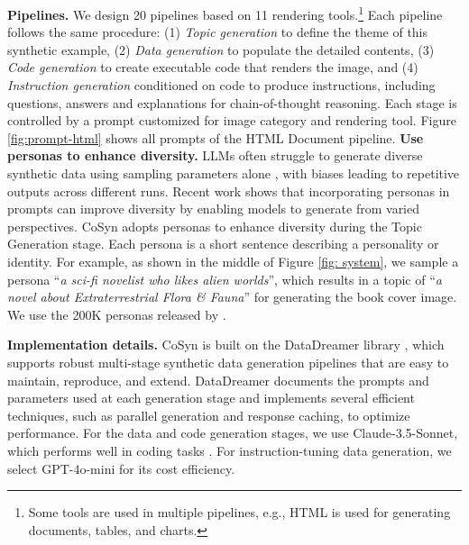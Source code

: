 \smallbreak
\noindent \textbf{Pipelines.} We design 20 pipelines based on 11 rendering tools.\footnote {Some tools are used in multiple pipelines, e.g., HTML is used for generating documents, tables, and charts.} 
Each pipeline follows the same procedure: (1) \textit{Topic generation} to define the theme of this synthetic example, (2) \textit{Data generation} to populate the detailed contents, (3) \textit{Code generation} to create executable code that renders the image, and (4) \textit{Instruction generation} conditioned on code to produce instructions, including questions, answers and explanations for chain-of-thought reasoning.
Each stage is controlled by a prompt customized for image category and rendering tool. Figure \ref{fig:prompt-html} shows all prompts of the HTML Document pipeline.
\smallbreak
\noindent \textbf{Use personas to enhance diversity.} 
LLMs often struggle to generate diverse synthetic data using sampling parameters alone \citep{yu2023large}, with biases leading to repetitive outputs across different runs. 
Recent work \citep{ge2024scalingsyntheticdatacreation} shows that incorporating personas in prompts can improve diversity by enabling models to generate from varied perspectives.
CoSyn adopts personas to enhance diversity during the Topic Generation stage. 
Each persona is a short sentence describing a personality or identity. 
For example, as shown in the middle of Figure \ref{fig: system}, we sample a persona ``\textit{a sci-fi novelist who likes alien worlds}'', which results in a topic of ``\textit{a novel about Extraterrestrial Flora \& Fauna}'' for generating the book cover image. 
We use the 200K personas released by \citet{ge2024scalingsyntheticdatacreation}.

\smallbreak
\noindent \textbf{Implementation details.} 
CoSyn is built on the DataDreamer library \citep{patel-etal-2024-datadreamer}, which supports robust multi-stage synthetic data generation pipelines that are easy to maintain, reproduce, and extend. 
DataDreamer documents the prompts and parameters used at each generation stage and implements several efficient techniques, such as parallel generation and response caching, to optimize performance.
For the data and code generation stages, we use Claude-3.5-Sonnet, which performs well in coding tasks \citep{Anthropic}. 
For instruction-tuning data generation, we select GPT-4o-mini \citep{gpt4} for its cost efficiency. 

